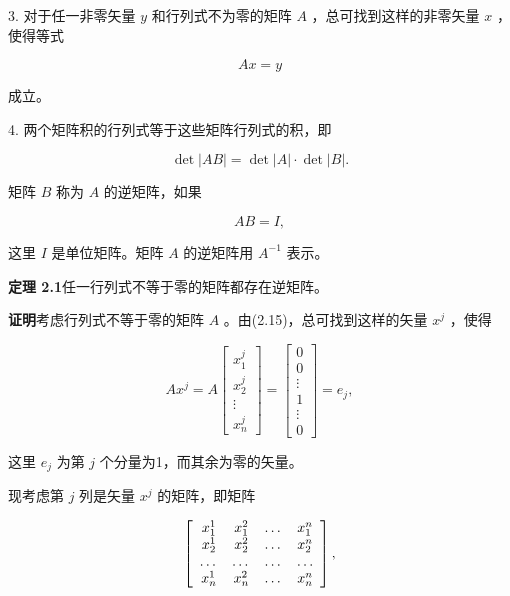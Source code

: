 3. 对于任一非零矢量 $y$ 和行列式不为零的矩阵 $A$ ，总可找到这样的非零矢量 $x$ ，使得等式

\begin{equation*}
A x = y\tag{2.15}
\end{equation*}

成立。

4. 两个矩阵积的行列式等于这些矩阵行列式的积，即

\begin{equation*}
\det | A B | = \det | A | \cdot \det | B |.\tag{2.16}
\end{equation*}

矩阵 $B$ 称为 $A$ 的逆矩阵，如果

\begin{equation*}
A B = I,\tag{2.17}
\end{equation*}

这里 $I$ 是单位矩阵。矩阵 $A$ 的逆矩阵用 $A^{-1}$ 表示。

\textbf{定理 2.1}\quad 任一行列式不等于零的矩阵都存在逆矩阵。

\textbf{证明}\quad 考虑行列式不等于零的矩阵 $A$ 。由(2.15)，总可找到这样的矢量 $x^j$ ，使得

\begin{equation*}
A x ^ {j} = A \left[ \begin{array}{c} x _ {1} ^ {j} \\ x _ {2} ^ {j} \\ \vdots \\ x _ {n} ^ {j} \end{array} \right] = \left[ \begin{array}{c} 0 \\ 0 \\ \vdots \\ 1 \\ \vdots \\ 0 \end{array} \right] = e _ {j},
\end{equation*}

这里 $e_{j}$ 为第 $j$ 个分量为1，而其余为零的矢量。

现考虑第 $j$ 列是矢量 $x^{j}$ 的矩阵，即矩阵

\begin{equation*}
\left[ \begin{array}{c c c c} x _ {1} ^ {1} & x _ {1} ^ {2} & \dots & x _ {1} ^ {n} \\ x _ {2} ^ {1} & x _ {2} ^ {2} & \dots & x _ {2} ^ {n} \\ \dots & \dots & \dots & \dots \\ x _ {n} ^ {1} & x _ {n} ^ {2} & \dots & x _ {n} ^ {n} \end{array} \right],
\end{equation*}

